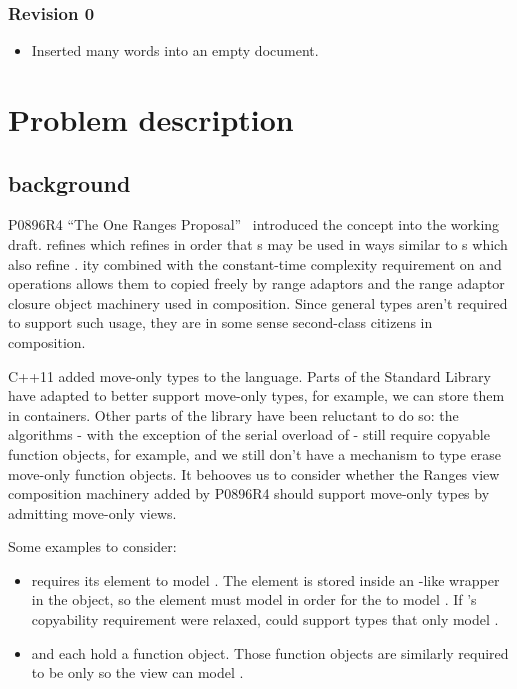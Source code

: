 \subsection{Revision 0}
\begin{itemize}
\item Inserted many words into an empty document.
\end{itemize}

\chapter{Problem description}

\section{background}
P0896R4 ``The One Ranges Proposal''~\cite{p0896} introduced the 
concept into the \Cpp working draft.  refines 
which refines  in order that s may be used in ways
similar to s which also refine .
ity combined with the constant-time complexity requirement on
 and  operations allows them to copied freely by
range adaptors and the range adaptor closure object machinery used in
 composition. Since general  types aren't required to
support such usage, they are in some sense second-class citizens in 
composition.

C++11 added move-only types to the language. Parts of the Standard Library have
adapted to better support move-only types, for example, we can store them in
containers. Other parts of the library have been reluctant to do so: the
algorithms
- with the exception of the serial overload of  -
still require copyable function objects, for example, and we still don't have a
mechanism to type erase move-only function objects. It behooves us to consider
whether the Ranges view composition machinery added by P0896R4 should support
move-only types by admitting move-only views.

Some examples to consider:
\begin{itemize}
\item {} requires its element to model
  . The element is stored inside an
  -like wrapper in the  object, so the
  element must model  in order for the
   to model . If 's
  copyability requirement were relaxed,  could support types
  that only model .
\item {} and  each hold a function object.
  Those function objects are similarly required to be 
  only so the view can model .
\end{itemize}


